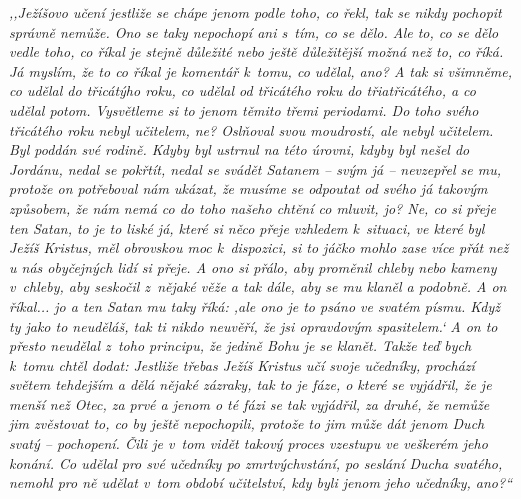 
\textit{%
,,Ježíšovo učení jestliže se chápe jenom podle toho, co řekl, tak se nikdy
pochopit správně nemůže. Ono se taky nepochopí ani s~tím, co se dělo.
Ale to, co se dělo vedle toho, co říkal je stejně důležité nebo ještě důležitější
možná než to, co říká. Já myslím, že to co říkal je komentář k~tomu, co udělal,
ano? A
tak si všimněme, co udělal do třicátýho roku, co udělal od třicátého roku do
třiatřicátého, a co udělal potom. Vysvětleme si to jenom těmito třemi
periodami. Do toho svého třicátého roku nebyl učitelem, ne? Oslňoval svou
moudrostí,
ale nebyl učitelem. Byl poddán své rodině. Kdyby byl ustrnul na této úrovni, kdyby byl
nešel do Jordánu, nedal se pokřtít, nedal se svádět Satanem -- svým já -- nevzepřel
se mu, protože on potřeboval nám ukázat, že musíme se odpoutat od svého já takovým
způsobem, že nám nemá co do toho našeho chtění co mluvit, jo? Ne, co si přeje
ten Satan, to je to liské já, které si něco přeje vzhledem k~situaci, ve které byl
Ježíš Kristus, měl obrovskou moc k~dispozici, si to jáčko mohlo zase více přát
než u nás obyčejných lidí si přeje. A ono si přálo, aby proměnil chleby nebo kameny
v~chleby, aby seskočil z~nějaké věže a tak dále, aby se mu klaněl a podobně. A on
říkal... jo a ten Satan mu taky říká: ,ale ono je to psáno ve svatém písmu. Když ty
jako to neuděláš, tak ti nikdo neuvěří, že jsi opravdovým spasitelem.` A on to přesto
neudělal z~toho principu, že jedině Bohu je se klanět. Takže teď bych k~tomu chtěl
dodat: Jestliže třebas Ježíš Kristus učí svoje učedníky, prochází světem tehdejším
a dělá nějaké zázraky, tak to je fáze, o které se vyjádřil, že je menší než
Otec, za
prvé a jenom o té fázi se tak vyjádřil, za druhé, že nemůže jim zvěstovat to,
co by ještě nepochopili, protože to jim může dát jenom Duch svatý -- pochopení. Čili
je v~tom vidět takový proces vzestupu ve veškerém jeho konání. Co udělal pro své
učedníky po zmrtvýchvstání, po seslání Ducha svatého, nemohl pro ně udělat v~tom
období učitelství, kdy byli jenom jeho učedníky, ano?{}``
}

